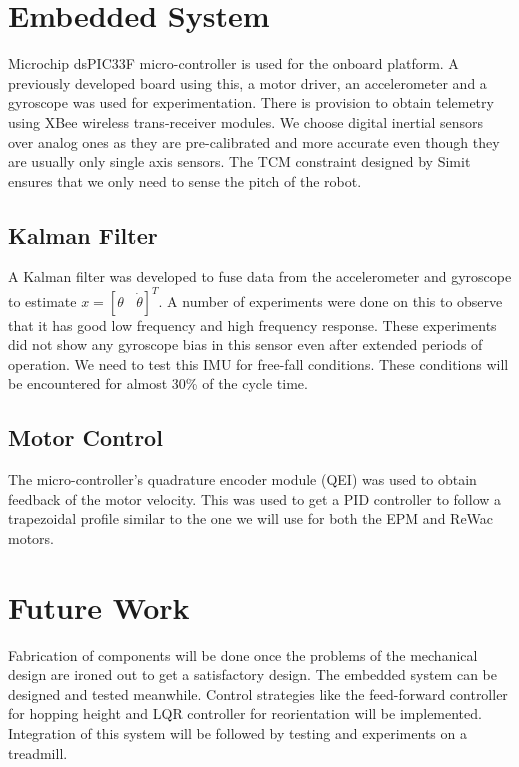 \documentclass[10pt, compsocconf, conference]{IEEEtran}
\begin{document}
\section{Embedded System}
Microchip dsPIC33F micro-controller is used for the onboard platform. A previously developed board using this, a motor driver,
an accelerometer and a gyroscope was used for experimentation. There is provision to obtain telemetry using XBee wireless
trans-receiver modules. We choose
digital inertial sensors over analog ones as they are pre-calibrated and more accurate even though they are usually only single axis
sensors. The TCM constraint designed by Simit ensures that we only need to sense the pitch of the robot.
\subsection{Kalman Filter}
A Kalman filter was developed to fuse data from the accelerometer and gyroscope to estimate $x = [ \theta\:\:\:\:\dot{\theta}]^T$.
A number of experiments were done on this to observe that it has good low frequency and high frequency response.
These experiments did not show any gyroscope bias in this sensor even after extended periods of operation.
We need to test this IMU for free-fall conditions. These conditions will be encountered for almost 30\% of the cycle time.
\subsection{Motor Control}
The micro-controller's quadrature encoder module (QEI) was used to obtain feedback of the motor velocity. This was used to get
a PID controller to follow a trapezoidal profile similar to the one we will use for both the EPM and ReWac motors.

\section{Future Work}
Fabrication of components will be done once the problems of the mechanical design are ironed out to get a satisfactory design.
The embedded system can be designed and tested meanwhile. Control strategies like the feed-forward controller for hopping height
and LQR controller for reorientation will be implemented. Integration of this system will be followed by testing and experiments
on a treadmill.
\end{document}
